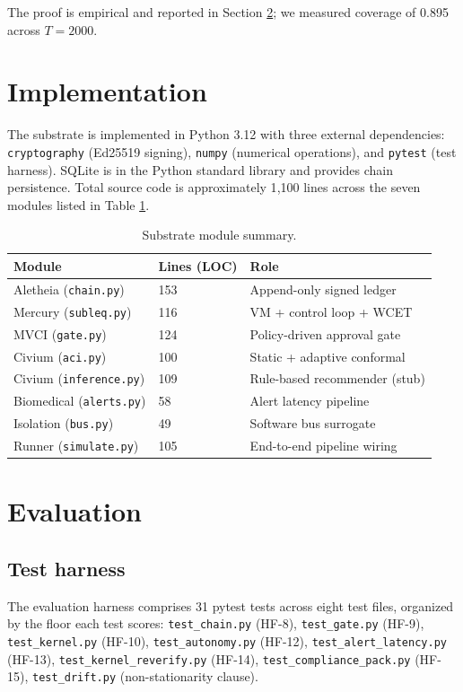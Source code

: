 \documentclass[conference]{IEEEtran}
\theoremstyle{definition}
\theoremstyle{plain}
\theoremstyle{remark}
\begin{document}
The proof is empirical and reported in Section \ref{sec:eval}; we measured coverage of 0.895 across $T = 2000$.

\section{Implementation}
\label{sec:impl}

The substrate is implemented in Python 3.12 with three external dependencies: \texttt{cryptography} (Ed25519 signing), \texttt{numpy} (numerical operations), and \texttt{pytest} (test harness). SQLite is in the Python standard library and provides chain persistence. Total source code is approximately 1{,}100 lines across the seven modules listed in Table \ref{tab:modules}.

\begin{table}[t]
\centering
\caption{Substrate module summary.}
\label{tab:modules}
\begin{tabular}{lll}
\toprule
Module & Lines (LOC) & Role \\
\midrule
Aletheia (\texttt{chain.py}) & 153 & Append-only signed ledger \\
Mercury (\texttt{subleq.py}) & 116 & VM + control loop + WCET \\
MVCI (\texttt{gate.py}) & 124 & Policy-driven approval gate \\
Civium (\texttt{aci.py}) & 100 & Static + adaptive conformal \\
Civium (\texttt{inference.py}) & 109 & Rule-based recommender (stub) \\
Biomedical (\texttt{alerts.py}) & 58 & Alert latency pipeline \\
Isolation (\texttt{bus.py}) & 49 & Software bus surrogate \\
Runner (\texttt{simulate.py}) & 105 & End-to-end pipeline wiring \\
\bottomrule
\end{tabular}
\end{table}

\section{Evaluation}
\label{sec:eval}

\subsection{Test harness}

The evaluation harness comprises 31 pytest tests across eight test files, organized by the floor each test scores:
\texttt{test\_chain.py} (HF-8),
\texttt{test\_gate.py} (HF-9),
\texttt{test\_kernel.py} (HF-10),
\texttt{test\_autonomy.py} (HF-12),
\texttt{test\_alert\_latency.py} (HF-13),
\texttt{test\_kernel\_reverify.py} (HF-14),
\texttt{test\_compliance\_pack.py} (HF-15),
\texttt{test\_drift.py} (non-stationarity clause).
\end{document}
